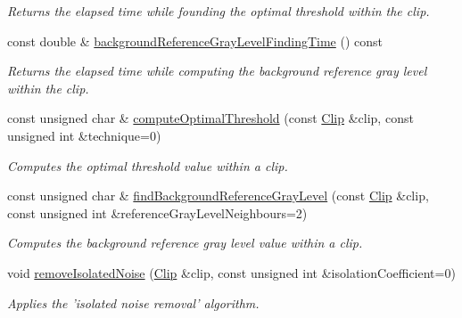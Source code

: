 \begin{CompactItemize}
\begin{CompactList}\small\item\em Returns the elapsed time while founding the optimal threshold within the clip. \item\end{CompactList}\item 
const double \& \hyperlink{class_preprocessor_2cb04f2116b4afc783ff070026bc1297}{backgroundReferenceGrayLevelFindingTime} () const 
\begin{CompactList}\small\item\em Returns the elapsed time while computing the background reference gray level within the clip. \item\end{CompactList}\item 
const unsigned char \& \hyperlink{class_preprocessor_aaeb94a3b52b835bc26efebb40be25bc}{computeOptimalThreshold} (const \hyperlink{class_clip}{Clip} \&clip, const unsigned int \&technique=0)
\begin{CompactList}\small\item\em Computes the optimal threshold value within a clip. \item\end{CompactList}\item 
const unsigned char \& \hyperlink{class_preprocessor_a941f81382bd8e235e4dd12481342be4}{findBackgroundReferenceGrayLevel} (const \hyperlink{class_clip}{Clip} \&clip, const unsigned int \&referenceGrayLevelNeighbours=2)
\begin{CompactList}\small\item\em Computes the background reference gray level value within a clip. \item\end{CompactList}\item 
void \hyperlink{class_preprocessor_a3e047486a0a80f2103f51d7141e41c5}{removeIsolatedNoise} (\hyperlink{class_clip}{Clip} \&clip, const unsigned int \&isolationCoefficient=0)
\begin{CompactList}\small\item\em Applies the 'isolated noise removal' algorithm. \item\end{CompactList}\end{CompactItemize}
